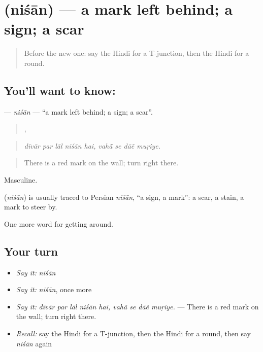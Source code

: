 \section[\texorpdfstring{\hi{निशान} (niśān)}{निशान (niśān)}]{ (niśān) — a mark left behind; a sign; a scar}

\label{lesson:HI-C419-nisan}



\begin{quote}
Before the new one: say the Hindi for a T-junction, then the Hindi for a round.
\end{quote}

\subsection*{You'll want to know: }
\textbf{} — \emph{niśān} — \textquotedblleft{}a mark left behind; a sign; a scar\textquotedblright{}.

\begin{quote}
    ,    
\end{quote}

\begin{quote}
\emph{dīvār par lāl niśān hai, vahā̃ se dāẽ muṛiye.}
\end{quote}

\begin{quote}
There is a red mark on the wall; turn right there.
\end{quote}

Masculine.

\begin{cousinweb}
\textbf{} (\emph{niśān}) is usually traced to Persian \emph{nišān}, \textquotedblleft{}a sign, a mark\textquotedblright{}: a scar, a stain, a mark to steer by.
\end{cousinweb}

\begin{grammarlens}[title={What you've built}]
One more word for getting around.
\end{grammarlens}

\subsection*{Your turn}
\begin{itemize}
\raggedright
  \item \emph{Say it:} \emph{niśān}
  \item \emph{Say it:} \emph{niśān}, once more
  \item \emph{Say it:} \emph{dīvār par lāl niśān hai, vahā̃ se dāẽ muṛiye.} — There is a red mark on the wall; turn right there.
  \item \emph{Recall:} say the Hindi for a T-junction, then the Hindi for a round, then say \emph{niśān} again
\end{itemize}

